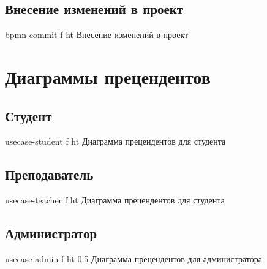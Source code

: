 \documentclass{bmstu}
\begin{document}
\subsection*{Внесение изменений в проект}
{bpmn-commit}
{f}
{ht}
{\textwidth}
{Внесение изменений в проект}
\FloatBarrier

\section{Диаграммы прецендентов}

\subsection*{Студент}
{usecase-student}
{f}
{ht}
{\textwidth}
{Диаграмма прецендентов для студента}
\FloatBarrier

\subsection*{Преподаватель}
{usecase-teacher}
{f}
{ht}
{\textwidth}
{Диаграмма прецендентов для студента}
\FloatBarrier

\subsection*{Администратор}
{usecase-admin}
{f}
{ht}
{0.5 \textwidth}
{Диаграмма прецендентов для администратора}
\FloatBarrier

%
%
%
\end{document}
